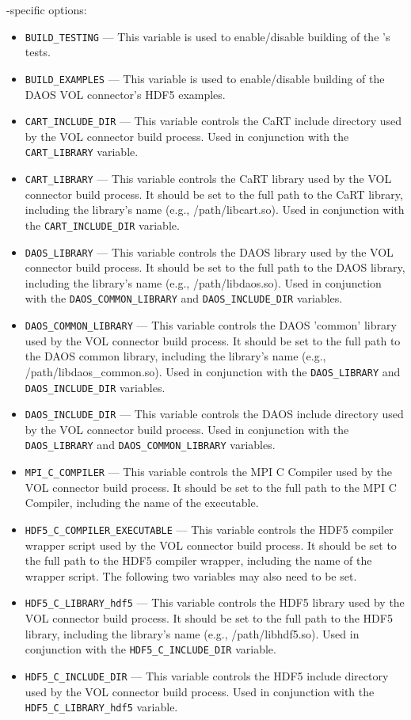\documentclass[../users_guide.tex]{subfiles}
\begin{document}
\dvc{}-specific options:

\begin{itemize}
  \item \texttt{BUILD\_TESTING} --- This variable is used to enable/disable building of the \dvc{}'s tests.
  \item \texttt{BUILD\_EXAMPLES} --- This variable is used to enable/disable building of the DAOS VOL connector's HDF5 examples.
  \item \texttt{CART\_INCLUDE\_DIR} --- This variable controls the CaRT include directory used by the VOL connector build process. Used in conjunction with the \texttt{CART\_LIBRARY} variable.
  \item \texttt{CART\_LIBRARY} --- This variable controls the CaRT library used by the VOL connector build process. It should be set to the full path to the CaRT library, including the library's name (e.g., /path/libcart.so). Used in conjunction with the \texttt{CART\_INCLUDE\_DIR} variable.
  \item \texttt{DAOS\_LIBRARY} --- This variable controls the DAOS library used by the VOL connector build process. It should be set to the full path to the DAOS library, including the library's name (e.g., /path/libdaos.so). Used in conjunction with the \texttt{DAOS\_COMMON\_LIBRARY} and \texttt{DAOS\_INCLUDE\_DIR} variables.
  \item \texttt{DAOS\_COMMON\_LIBRARY} --- This variable controls the DAOS 'common' library used by the VOL connector build process. It should be set to the full path to the DAOS common library, including the library's name (e.g., /path/libdaos\_common.so). Used in conjunction with the \texttt{DAOS\_LIBRARY} and \texttt{DAOS\_INCLUDE\_DIR} variables.
  \item \texttt{DAOS\_INCLUDE\_DIR} --- This variable controls the DAOS include directory used by the VOL connector build process. Used in conjunction with the \texttt{DAOS\_LIBRARY} and \texttt{DAOS\_COMMON\_LIBRARY} variables.
  \item \texttt{MPI\_C\_COMPILER} --- This variable controls the MPI C Compiler used by the VOL connector build process. It should be set to the full path to the MPI C Compiler, including the name of the executable.
  \item \texttt{HDF5\_C\_COMPILER\_EXECUTABLE} --- This variable controls the HDF5 compiler wrapper script used by the VOL connector build process. It should be set to the full path to the HDF5 compiler wrapper, including the name of the wrapper script. The following two variables may also need to be set.
  \item \texttt{HDF5\_C\_LIBRARY\_hdf5} --- This variable controls the HDF5 library used by the VOL connector build process. It should be set to the full path to the HDF5 library, including the library's name (e.g., /path/libhdf5.so). Used in conjunction with the \texttt{HDF5\_C\_INCLUDE\_DIR} variable.
  \item \texttt{HDF5\_C\_INCLUDE\_DIR} --- This variable controls the HDF5 include directory used by the VOL connector build process. Used in conjunction with the \texttt{HDF5\_C\_LIBRARY\_hdf5} variable.
\end{itemize}
\end{document}

